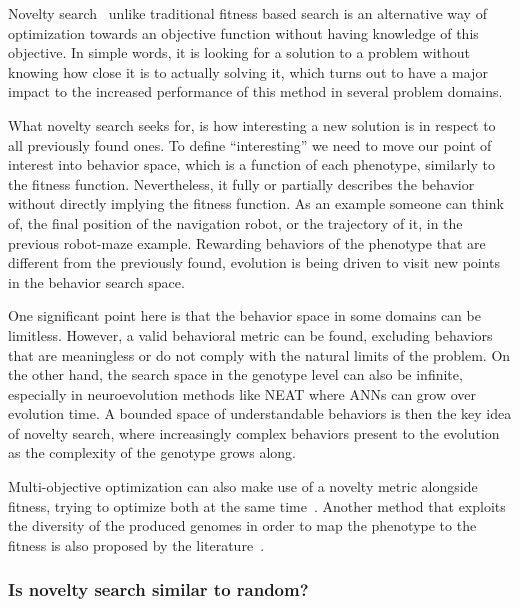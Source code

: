 Novelty search~\citep{lehman2008exploiting,lehman2011abandoning,lehman2010revising, risi2009novelty} unlike traditional fitness based search is an alternative way of optimization towards an objective function without having knowledge of this objective. In simple words, it is looking for a solution to a problem without knowing how close it is to actually solving it, which turns out to have a major impact to the increased performance of this method in several problem domains. 

What novelty search seeks for, is how interesting a new solution is in respect to all previously found ones. To define ``interesting'' we need to move our point of interest into behavior space, which is a function of each phenotype, similarly to the fitness function. Nevertheless, it fully or partially describes the behavior without directly implying the fitness function. As an example someone can think of, the final position of the navigation robot, or the trajectory of it, in the previous robot-maze example. Rewarding behaviors of the phenotype that are different from the previously found, evolution is being driven to visit new points in the behavior search space.

One significant point here is that the behavior space in some domains can be limitless. However, a valid behavioral metric can be found, excluding behaviors that are meaningless or do not comply with the natural limits of the problem. On the other hand, the search space in the genotype level can also be infinite, especially in neuroevolution methods like NEAT where ANNs can grow over evolution time. A bounded space of understandable behaviors is then the key idea of novelty search, where increasingly complex behaviors present to the evolution as the complexity of the genotype grows along.

Multi-objective optimization can also make use of a novelty metric alongside fitness, trying to optimize both at the same time~\citep{mouret2011novelty}. Another method that exploits the diversity of the produced genomes in order to map the phenotype to the fitness is also proposed by the literature~\citep{mouret2012algorithm}.

\subsubsection*{Is novelty search similar to random?}

